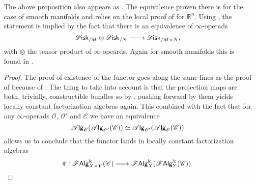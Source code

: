\documentclass[../text]{subfiles}
\begin{document}
\begin{remark}
    The above proposition also appears as \cite[prop.18]{ginot2015}. The equivalence proven there is for the case of smooth manifolds and relies on the local proof of \cite{lurie_ha} for $\mathbb{R}^n$. Using , the statement is implied by the fact that there is an equivalence of $\infty$-operads
    \begin{equation}
        \disk_{/M} \otimes \disk_{/N} \xrightarrow{\ \ \ \ \ } \disk_{/M \times N},
    \end{equation}
    with $\otimes$ the tensor product of $\infty$-opeards. Again for smooth manifolds this is found in \cite[ex.5.4.5.5]{lurie_ha}.
\end{remark}

\begin{proof}
    The proof of existence of the functor goes along the same lines as the proof of  because of . The thing to take into account is that the projection maps are both, trivially, constructible bundles so by , pushing forward by them yields locally constant factorization algebras again. This combined with the fact that for any $\infty$-operads $\mathscr{O}$, $\mathscr{O}'$ and $\mathscr{C}$ we have an equivalence
    \begin{equation}
        \mathscr{A} \mathsf{lg}_{\mathscr{O}} (\mathscr{A} \mathsf{lg}_{\mathscr{O}'} (\mathscr{C})) \simeq \mathscr{A} \mathsf{lg}_{\mathscr{O}'} (\mathscr{A} \mathsf{lg}_{\mathscr{O}} (\mathscr{C}))
    \end{equation}
    allows us to conclude that the functor lands in locally constant factorization algebras
    \begin{equation}
        \bar{\pi}: \mathscr{F} \mathsf{Alg}^{\mathsf{lc}}_{X \times Y}(\mathscr{C}) \xrightarrow{\ \ \ \ } \mathscr{F} \mathsf{Alg}^{\mathsf{lc}}_{X}(\mathscr{F} \mathsf{Alg}^{\mathsf{lc}}_{Y}(\mathscr{C})).
    \end{equation}


\end{proof}
\end{document}
